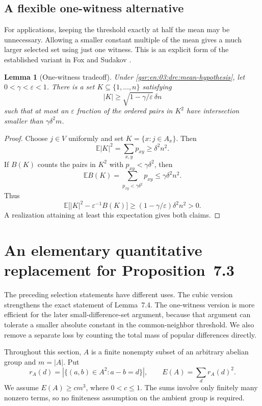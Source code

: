 \documentclass[11pt,letterpaper]{article}
\numberwithin{equation}{section}
\newtheorem{lemma}[theorem]{Lemma}
\theoremstyle{definition}
\theoremstyle{remark}
\newcommand{\E}{\mathbb E}
\newcommand{\1}{\mathbf 1}
\newcommand{\abs}[1]{\left|#1\right|}
\newcommand{\srctag}[1]{\texorpdfstring{\enspace\textup{[#1]}}{ [#1]}}
\newcommand{\srcnote}[2]{\par\noindent{\small\textit{Source #1, delivered #2.}}\par}
\begin{document}
\subsection{A flexible one-witness alternative}

For applications, keeping the threshold exactly at half the mean may be
unnecessary.  Allowing a smaller constant multiple of the mean gives a
much larger selected set using just one witness.  This is an explicit
form of the established variant in Fox and Sudakov
\cite[Lemma~5.1]{foxsudakov}.

\begin{lemma}[One-witness tradeoff]\label{gsr:en:03:drc:one-witness}
Under \eqref{gsr:en:03:drc:mean-hypothesis}, let $0<\gamma<\varepsilon<1$.
There is a set $K\subseteq\{1,\ldots,n\}$ satisfying
\[
 \abs K\geq\sqrt{1-\gamma/\varepsilon}\,\delta n
\]
such that at most an $\varepsilon$ fraction of the ordered pairs in
$K^2$ have intersection smaller than $\gamma\delta^2m$.
\end{lemma}

\begin{proof}
Choose $j\in V$ uniformly and set $K=\{x:j\in A_x\}$.  Then
\[
 \E\abs K^2=\sum_{x,y}p_{xy}\geq\delta^2n^2.
\]
If $B(K)$ counts the pairs in $K^2$ with
$p_{xy}<\gamma\delta^2$, then
\[
 \E B(K)=\sum_{p_{xy}<\gamma\delta^2}p_{xy}
 \leq\gamma\delta^2n^2.
\]
Thus
\[
 \E\bigl[\abs K^2-\varepsilon^{-1}B(K)\bigr]
 \geq(1-\gamma/\varepsilon)\delta^2n^2>0.
\]
A realization attaining at least this expectation gives both claims.
\end{proof}

\section[{An elementary quantitative replacement for Proposition~7.3\srctag{03}}]{An elementary quantitative replacement for Proposition~7.3}\label{gsr:en:03:sec:d8}
\srcnote{03}{Section 8}
\label{gsr:en:03:drc:bsg-section}

The preceding selection statements have different uses.  The cubic
version strengthens the exact statement of Lemma~7.4.  The one-witness
version is more efficient for the later small-difference-set argument,
because that argument can tolerate a smaller absolute constant in the
common-neighbor threshold.  We also remove a separate loss by counting
the total mass of popular differences directly.

Throughout this section, $A$ is a finite nonempty subset of an arbitrary
abelian group and $m=\abs A$.  Put
\[
 r_A(d)=\abs{\{(a,b)\in A^2:a-b=d\}},
 \qquad E(A)=\sum_d r_A(d)^2.
\]
We assume $E(A)\geq cm^3$, where $0<c\leq1$.  The sums involve only
finitely many nonzero terms, so no finiteness assumption on the ambient
group is required.
\end{document}
